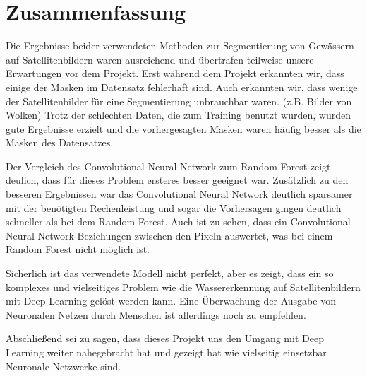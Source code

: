 \section{Zusammenfassung}
\label{sec:Zusammenfassung}

Die Ergebnisse beider verwendeten Methoden zur Segmentierung von Gewässern auf Satellitenbildern waren ausreichend
und übertrafen teilweise unsere Erwartungen vor dem Projekt.
Erst während dem Projekt erkannten wir, dass einige der Masken im Datensatz fehlerhaft sind.
Auch erkannten wir, dass wenige der Satellitenbilder für eine Segmentierung unbrauchbar waren. (z.B. Bilder von Wolken)
Trotz der schlechten Daten, die zum Training benutzt wurden, wurden gute Ergebnisse erzielt 
und die vorhergesagten Masken waren häufig besser als die Masken des Datensatzes.

Der Vergleich des Convolutional Neural Network zum Random Forest zeigt deulich, dass für dieses Problem ersteres besser geeignet war.
Zusätzlich zu den besseren Ergebnissen war das Convolutional Neural Network deutlich sparsamer mit der benötigten Rechenleistung 
und sogar die Vorhersagen gingen deutlich schneller als bei dem Random Forest.
Auch ist zu sehen, dass ein Convolutional Neural Network Beziehungen zwischen den Pixeln auswertet, was bei einem Random Forest nicht möglich ist.

Sicherlich ist das verwendete Modell nicht perfekt, aber es zeigt, dass ein so komplexes und vielseitiges Problem 
wie die Wassererkennung auf Satellitenbildern mit Deep Learning gelöst werden kann.
Eine Überwachung der Ausgabe von Neuronalen Netzen durch Menschen ist allerdings noch zu empfehlen.

Abschließend sei zu sagen, dass dieses Projekt uns den Umgang mit Deep Learning weiter nahegebracht hat 
und gezeigt hat wie vielseitig einsetzbar Neuronale Netzwerke sind.
